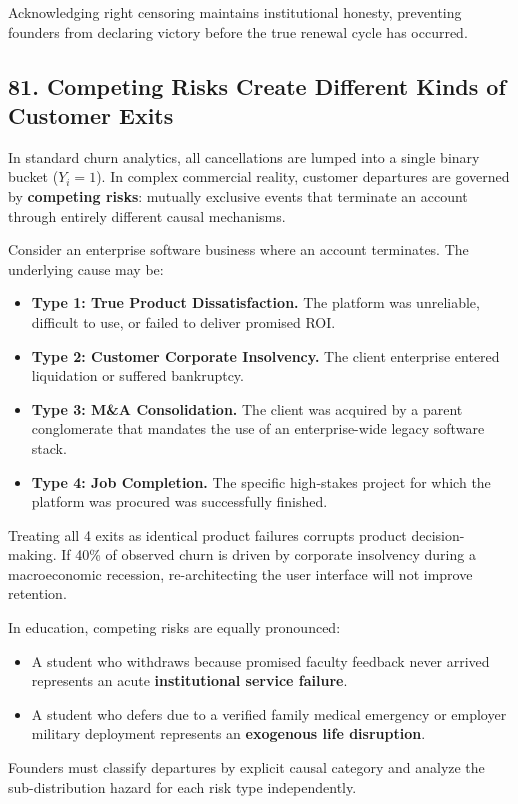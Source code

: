 Acknowledging right censoring maintains institutional honesty, preventing founders from declaring victory before the true renewal cycle has occurred.

\subsection*{81. Competing Risks Create Different Kinds of Customer Exits}

In standard churn analytics, all cancellations are lumped into a single binary bucket ($Y_i = 1$). In complex commercial reality, customer departures are governed by \textbf{competing risks}: mutually exclusive events that terminate an account through entirely different causal mechanisms.

Consider an enterprise software business where an account terminates. The underlying cause may be:
\begin{itemize}[leftmargin=*]
\item \textbf{Type 1: True Product Dissatisfaction.} The platform was unreliable, difficult to use, or failed to deliver promised ROI.
\item \textbf{Type 2: Customer Corporate Insolvency.} The client enterprise entered liquidation or suffered bankruptcy.
\item \textbf{Type 3: M\&A Consolidation.} The client was acquired by a parent conglomerate that mandates the use of an enterprise-wide legacy software stack.
\item \textbf{Type 4: Job Completion.} The specific high-stakes project for which the platform was procured was successfully finished.
\end{itemize}

Treating all 4 exits as identical product failures corrupts product decision-making. If 40\% of observed churn is driven by corporate insolvency during a macroeconomic recession, re-architecting the user interface will not improve retention.

In education, competing risks are equally pronounced:
\begin{itemize}[leftmargin=*]
\item A student who withdraws because promised faculty feedback never arrived represents an acute \textbf{institutional service failure}.
\item A student who defers due to a verified family medical emergency or employer military deployment represents an \textbf{exogenous life disruption}.
\end{itemize}
Founders must classify departures by explicit causal category and analyze the sub-distribution hazard for each risk type independently.

